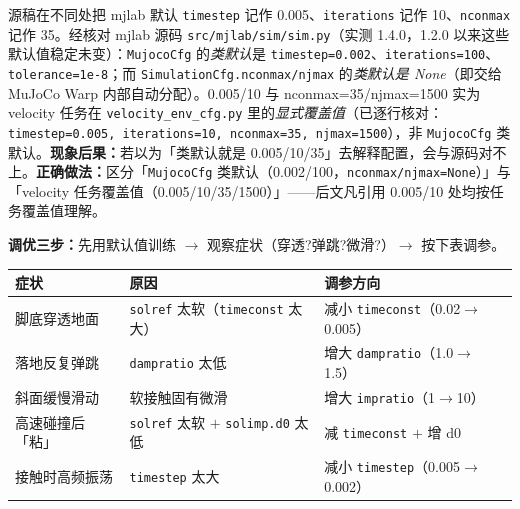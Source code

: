 \begin{pitfall}
源稿在不同处把 mjlab 默认 \verb|timestep| 记作 0.005、\verb|iterations| 记作 10、\verb|nconmax| 记作 35。经核对 mjlab 源码 \verb|src/mjlab/sim/sim.py|（实测 1.4.0，1.2.0 以来这些默认值稳定未变）：\verb|MujocoCfg| 的\emph{类默认}是 \verb|timestep=0.002|、\verb|iterations=100|、\verb|tolerance=1e-8|；而 \verb|SimulationCfg.nconmax/njmax| 的\emph{类默认是 None}（即交给 MuJoCo Warp 内部自动分配）。0.005/10 与 nconmax=35/njmax=1500 实为 velocity 任务在 \verb|velocity_env_cfg.py| 里的\emph{显式覆盖值}（已逐行核对：\verb|timestep=0.005, iterations=10, nconmax=35, njmax=1500|），非 \verb|MujocoCfg| 类默认。\textbf{现象后果：}若以为「类默认就是 0.005/10/35」去解释配置，会与源码对不上。\textbf{正确做法：}区分「\texttt{MujocoCfg} 类默认（0.002/100，\texttt{nconmax/njmax=None}）」与「velocity 任务覆盖值（0.005/10/35/1500）」——后文凡引用 0.005/10 处均按任务覆盖值理解。
\end{pitfall}

\textbf{调优三步：}先用默认值训练 $\to$ 观察症状（穿透?弹跳?微滑?）$\to$ 按下表调参。

\begin{center}
\small
\begin{tabular}{@{}lll@{}}
\toprule
症状 & 原因 & 调参方向 \\
\midrule
脚底穿透地面 & \verb|solref| 太软（\verb|timeconst| 太大） & 减小 \verb|timeconst|（0.02$\to$0.005） \\
落地反复弹跳 & \verb|dampratio| 太低 & 增大 \verb|dampratio|（1.0$\to$1.5） \\
斜面缓慢滑动 & 软接触固有微滑 & 增大 \verb|impratio|（1$\to$10） \\
高速碰撞后「粘」 & \verb|solref| 太软 $+$ \verb|solimp.d0| 太低 & 减 \verb|timeconst| $+$ 增 d0 \\
接触时高频振荡 & \verb|timestep| 太大 & 减小 \verb|timestep|（0.005$\to$0.002） \\
\bottomrule
\end{tabular}
\end{center}

